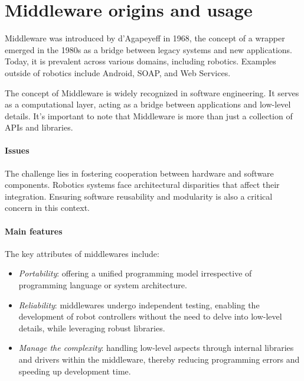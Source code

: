 \section{Middleware origins and usage}

Middleware was introduced by d'Agapeyeff in 1968, the concept of a wrapper emerged in the 1980s as a bridge between legacy systems and new applications. 
Today, it is prevalent across various domains, including robotics. 
Examples outside of robotics include Android, SOAP, and Web Services.

The concept of Middleware is widely recognized in software engineering. 
It serves as a computational layer, acting as a bridge between applications and low-level details. 
It's important to note that Middleware is more than just a collection of APIs and libraries.

\paragraph*{Issues}
The challenge lies in fostering cooperation between hardware and software components. 
Robotics systems face architectural disparities that affect their integration. 
Ensuring software reusability and modularity is also a critical concern in this context.

\paragraph*{Main features}
The key attributes of middlewares include:
\begin{itemize}
    \item \textit{Portability}: offering a unified programming model irrespective of programming language or system architecture.
    \item \textit{Reliability}: middlewares undergo independent testing, enabling the development of robot controllers without the need to delve into low-level details, while leveraging robust libraries.
    \item \textit{Manage the complexity}: handling low-level aspects through internal libraries and drivers within the middleware, thereby reducing programming errors and speeding up development time.
\end{itemize}